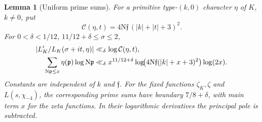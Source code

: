 \documentclass[11pt,a4paper]{article}
\numberwithin{equation}{section}
\newtheorem{lemma}[theorem]{Lemma}
\theoremstyle{definition}
\theoremstyle{remark}
\newcommand{\N}{\mathrm N}
\begin{document}
\begin{lemma}[Uniform prime sums]\label{lem:uniform}
For a primitive type-$(k,0)$ character $\eta$ of $K$, $k\ne0$, put
\[
 \mathcal C(\eta,t)=4\N\mathfrak f\,(|k|+|t|+3)^2.
\]
For $0<\delta<1/12$, $11/12+\delta\le\sigma\le2$,
\begin{align}\label{eq:uniformprime}
 |L'_K/L_K(\sigma+it,\eta)|&\ll_\delta\log\mathcal C(\eta,t),\notag\\
 \sum_{\N\mathfrak p\le x}\eta(\mathfrak p)\log\N\mathfrak p
 &\ll_\delta x^{11/12+\delta}
 \log\!\bigl(4\N\mathfrak f(|k|+x+3)^2\bigr)\log(2x).
\end{align}
Constants are independent of $k$ and $\mathfrak f$. For the fixed functions $\zeta_K,\zeta$ and $L(s,\chi_{-4})$, the corresponding prime sums have boundary $7/8+\delta$, with main term $x$ for the zeta functions. In their logarithmic derivatives the principal pole is subtracted.
\end{lemma}
\end{document}
